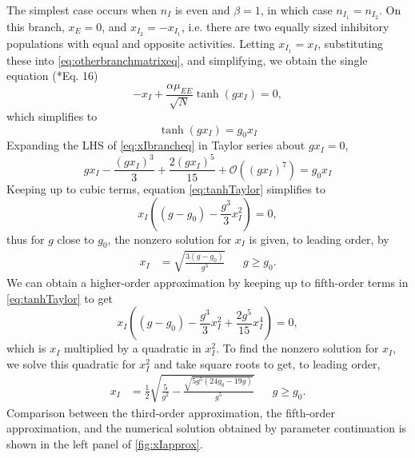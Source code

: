 \documentclass[11pt,reqno]{amsart}
\begin{document}
The simplest case occurs when $n_I$ is even and $\beta = 1$, in which case $n_{I_1}=n_{I_2}$. On this branch, $x_E = 0$, and $x_{I_2} = -x_{I_1}$, i.e. there are two equally sized inhibitory populations with equal and opposite activities. Letting $x_{I_1} = x_I$, substituting these into \cref{eq:otherbranchmatrixeq}, and simplifying, we obtain the single equation (\cite{Barreiro2017}*{Eq. 16})
\[
-x_I + \frac{\alpha \mu_{EE} }{\sqrt{N}} \tanh(g x_I) = 0, 
\]
which simplifies to 
\begin{equation}\label{eq:xIbrancheq}
\tanh(g x_I) = g_0 x_I
\end{equation}
Expanding the LHS of \cref{eq:xIbrancheq} in Taylor series about $g x_I = 0$,
\begin{equation}\label{eq:tanhTaylor}
g x_I - \frac{(g x_I)^3}{3} + \frac{2(g x_I)^5}{15} + \mathcal{O}\left( (g x_I)^7 \right) = g_0 x_I
\end{equation}
Keeping up to cubic terms, equation \cref{eq:tanhTaylor} simplifies to
\[
x_I \left( (g - g_0) - \frac{g^3}{3} x_I^2 \right) = 0,
\]
thus for $g$ close to $g_0$, the nonzero solution for $x_I$ is given, to leading order, by
\begin{align}\label{eq:xIapprox}
x_I &= \sqrt{ \frac{3(g - g_0) }{g^3}} && g \geq g_0.
\end{align}
We can obtain a higher-order approximation by keeping up to fifth-order terms in \cref{eq:tanhTaylor} to get
\begin{equation*}
x_I \left( (g - g_0) - \frac{g^3}{3} x_I^2 + \frac{2 g^5}{15} x_I^4 \right) = 0,
\end{equation*}
which is $x_I$ multiplied by a quadratic in $x_I^2$. To find the nonzero solution for $x_I$, we solve this quadratic for $x_I^2$ and take square roots to get, to leading order,
\begin{align}\label{eq:xIapprox5}
x_I &= \frac{1}{2} \sqrt{ \frac{5}{g^2} - \frac{\sqrt{ 5 g^5( 24 g_0 - 19 g) }}{g^5}} && g \geq g_0.
\end{align}
Comparison between the third-order approximation, the fifth-order approximation, and the numerical solution obtained by parameter continuation is shown in the left panel of \cref{fig:xIapprox}.
\end{document}
